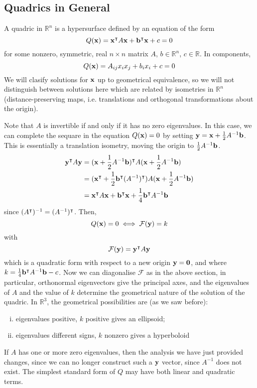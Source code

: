 \subsection{Quadrics in General}
A quadric in $\mathbb R^n$ is a hypersurface defined by an equation of the form
\[ Q(\vb x) = \vb x^\intercal A \vb x + \vb b^\intercal \vb x + c = 0 \]
for some nonzero, symmetric, real $n \times n$ matrix $A$, $b \in \mathbb R^n$, $c \in \mathbb R$. In components,
\[ Q(\vb x) = A_{ij}x_ix_j + b_ix_i + c = 0 \]
We will clasify solutions for $\vb x$ up to geometrical equivalence, so we will not distinguish between solutions here which are related by isometries in $\mathbb R^n$ (distance-preserving maps, i.e. translations and orthogonal transformations about the origin).

Note that $A$ is invertible if and only if it has no zero eigenvalues. In this case, we can complete the sequare in the equation $Q(\vb x) = 0$ by setting $\vb y = \vb x + \frac{1}{2}A^{-1} \vb b$. This is essentially a translation isometry, moving the origin to $\frac{1}{2}A^{-1} \vb b$.
\begin{align*}
	\vb y^\intercal A \vb y & = (\vb x + \frac{1}{2}A^{-1}\vb b)^\intercal A (\vb x + \frac{1}{2}A^{-1}\vb b)                         \\
	                         & = (\vb x^\intercal + \frac{1}{2}\vb b^\intercal(A^{-1})^\intercal) A (\vb x + \frac{1}{2}A^{-1}\vb b) \\
	                         & = \vb x^\intercal A \vb x + \vb b^\intercal \vb x + \frac{1}{4}\vb b^\intercal A^{-1}\vb b
\end{align*}
since $(A^\intercal)^{-1} = (A^{-1})^\intercal$. Then,
\[ Q(\vb x) = 0 \iff \mathcal F(\vb y) = k \]
with
\[ \mathcal F(\vb y) = \vb y^\intercal A \vb y \]
which is a quadratic form with respect to a new origin $\vb y = \vb 0$, and where $k = \frac{1}{4}\vb b^\intercal A^{-1}\vb b - c$. Now we can diagonalise $\mathcal F$ as in the above section, in particular, orthonormal eigenvectors give the principal axes, and the eigenvalues of $A$ and the value of $k$ determine the geometrical nature of the solution of the quadric. In $\mathbb R^3$, the geometrical possibilities are (as we saw before):
\begin{enumerate}[(i)]
	\item eigenvalues positive, $k$ positive gives an ellipsoid;
	\item eigenvalues different signs, $k$ nonzero gives a hyperboloid
\end{enumerate}
If $A$ has one or more zero eigenvalues, then the analysis we have just provided changes, since we can no longer construct such a $\vb y$ vector, since $A^{-1}$ does not exist. The simplest standard form of $Q$ may have both linear and quadratic terms.


